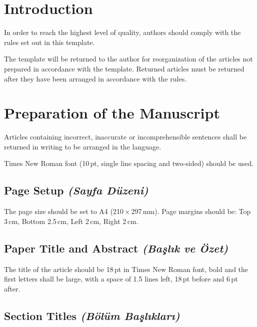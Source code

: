 \documentclass[10pt,a4paper,twocolumn]{article}
\begin{document}

\section{Introduction}

In order to reach the highest level of quality, authors should comply
with the rules set out in this template.

The template will be returned to the author for reorganization of the
articles not prepared in accordance with the template. Returned
articles must be returned after they have been arranged in accordance
with the rules.

\section{Preparation of the Manuscript}

Articles containing incorrect, inaccurate or incomprehensible
sentences shall be returned in writing to be arranged in the language.

Times New Roman font (10\,pt, single line spacing and two-sided)
should be used.

\subsection{Page Setup \normalfont\textit{(Sayfa Düzeni)}}

The page size should be set to A4 (210\,×\,297\,mm). Page margins
should be: Top 3\,cm, Bottom 2.5\,cm, Left 2\,cm, Right 2\,cm.

\subsection{Paper Title and Abstract \normalfont\textit{(Başlık ve Özet)}}

The title of the article should be 18\,pt in Times New Roman font,
bold and the first letters shall be large, with a space of 1.5 lines
left, 18\,pt before and 6\,pt after.

\subsection{Section Titles \normalfont\textit{(Bölüm Başlıkları)}}
\end{document}
